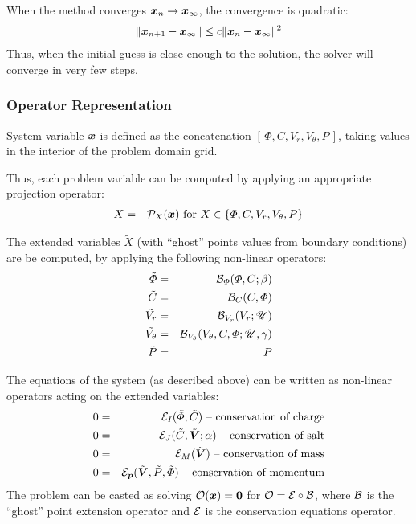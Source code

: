 When the method converges $\boldsymbol{x}_n \rightarrow \boldsymbol{x}_\infty$, 
the convergence is quadratic:
\begin{eqnarray}
\|\boldsymbol{x}_{n+1} - \boldsymbol{x}_\infty\| \le c\|\boldsymbol{x}_{n} - \boldsymbol{x}_\infty\|^2
\end{eqnarray}
Thus, when the initial guess is close enough to the solution, the solver
will converge in very few steps.


\subsubsection{Operator Representation}
System variable $\boldsymbol{x}$ is defined as the concatenation $[\,\varPhi, C, V_r, V_\theta, P\,]$,
taking values in the interior of the problem domain grid.

Thus, each problem variable can be computed by applying an appropriate projection operator:
\begin{eqnarray}
X &=& \mathcal{P}_X(\boldsymbol{x}) \mbox{ for } X \in \left\{\varPhi, C, V_r, V_\theta, P\right\}
\end{eqnarray}

The extended variables $\tilde X$ (with ``ghost'' points values 
from boundary conditions) are be computed, by applying the following non-linear operators:
\begin{eqnarray}
\tilde{\varPhi} &=& \mathcal{B}_\varPhi(\varPhi, C; \beta) \\
\tilde{C} &=& \mathcal{B}_C(C, \varPhi) \\
\tilde{V_r} &=& \mathcal{B}_{V_r}(V_r; \mathscr{U}) \\
\tilde{V_\theta} &=& \mathcal{B}_{V_\theta}(V_\theta, C, \varPhi; \mathscr{U}, \gamma) \\
\tilde{P} &=& P
\end{eqnarray}

The equations of the system (as described above) can be written as non-linear 
operators acting on the extended variables:
\begin{eqnarray}
0 &=& \mathcal{E}_I (\tilde\varPhi, \tilde C) \mbox{ -- conservation of charge} \\
0 &=& \mathcal{E}_J (\tilde C, \tilde{\boldsymbol{V}}; \alpha) \mbox{ -- conservation of salt} \\
0 &=& \mathcal{E}_M (\tilde{\boldsymbol{V}}) \mbox{ -- conservation of mass} \\
0 &=& \mathcal{E}_{\boldsymbol{p}} (\tilde{\boldsymbol{V}}, \tilde P, \tilde\varPhi) 
\mbox{ -- conservation of momentum}
\end{eqnarray}
The problem can be casted as solving $\mathcal{O}(\boldsymbol{x}) = \boldsymbol{0}$ for $\mathcal{O} = \mathcal{E} \circ \mathcal{B}$,
where $\mathcal{B}$ is the ``ghost'' point extension operator and $\mathcal{E}$ is the conservation
equations operator.

